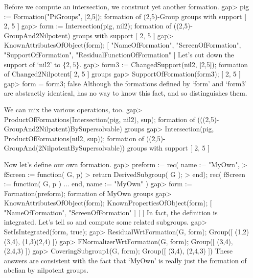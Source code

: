 Before we compute an intersection, we construct yet another formation.
\beginexample
gap> pig := Formation("PiGroups", [2,5]);
formation of (2,5)-Group groups with support [ 2, 5 ]
gap> form := Intersection(pig, nil2);
formation of ((2,5)-GroupAnd2Nilpotent) groups with support [ 2, 5 ]
gap> KnownAttributesOfObject(form);
[ "NameOfFormation", "ScreenOfFormation", "SupportOfFormation", 
  "ResidualFunctionOfFormation" ]
\endexample
 Let's cut down the support of `nil2' to $\{2,5\}$.
\beginexample
gap> form3 := ChangedSupport(nil2, [2,5]);
formation of Changed2Nilpotent[ 2, 5 ] groups
gap> SupportOfFormation(form3);
[ 2, 5 ]
gap> form = form3;
false
\endexample
Although the formations defined by `form' and `form3' are abstractly
identical, {\GAP} has no way to know this fact, and so distinguishes
them.

We can mix the various operations, too.
\beginexample
gap> ProductOfFormations(Intersection(pig, nil2), sup);
formation of (((2,5)-GroupAnd2Nilpotent)BySupersolvable) groups
gap> Intersection(pig, ProductOfFormations(nil2, sup));
formation of ((2,5)-GroupAnd(2NilpotentBySupersolvable)) groups with support 
[ 2, 5 ]
\endexample

  Now let's define our own formation.
\beginexample
gap> preform := rec( name := "MyOwn", 
>  fScreen := function( G, p)
>  return DerivedSubgroup( G );
>  end);
rec( fScreen := function( G, p ) ... end, name := "MyOwn" )
gap> form := Formation(preform);
formation of MyOwn groups
gap> KnownAttributesOfObject(form); KnownPropertiesOfObject(form);
[ "NameOfFormation", "ScreenOfFormation" ]
[  ]
\endexample
In fact, the definition is integrated. Let's tell {\GAP} so and compute
some related subgroups.
\beginexample
gap> SetIsIntegrated(form, true);
gap> ResidualWrtFormation(G, form);
Group([ (1,2)(3,4), (1,3)(2,4) ])
gap> FNormalizerWrtFormation(G, form);
Group([ (3,4), (2,4,3) ])
gap> CoveringSubgroup1(G, form);
Group([ (3,4), (2,4,3) ])
\endexample
These answers are consistent with the fact that `MyOwn' is really just the
formation of abelian by nilpotent groups.
